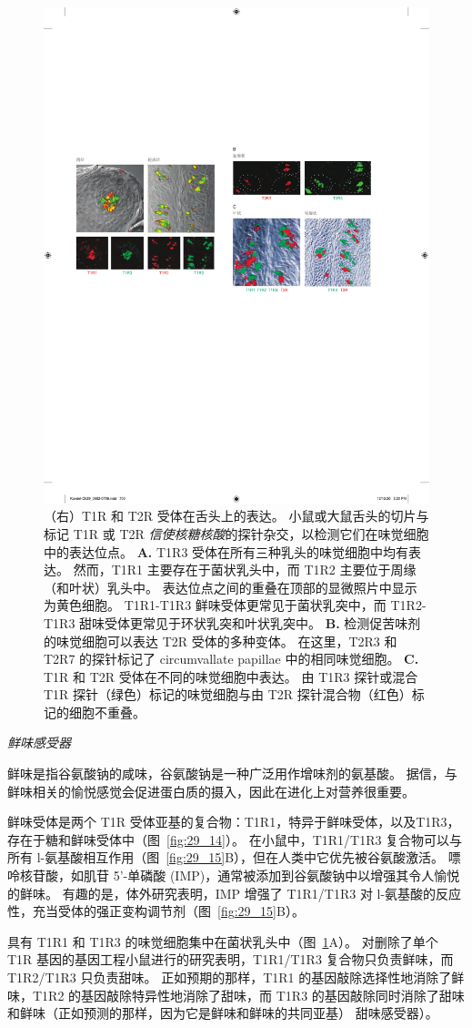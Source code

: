 \begin{figure}[htbp]
	\centering
	\includegraphics[width=0.5\linewidth]{chap29/fig_29_16}
	\caption{（右）T1R 和 T2R 受体在舌头上的表达。 小鼠或大鼠舌头的切片与标记 T1R 或 T2R \textit{信使核糖核酸}的探针杂交，以检测它们在味觉细胞中的表达位点。
		\textbf{A.} T1R3 受体在所有三种乳头的味觉细胞中均有表达。
		然而，T1R1 主要存在于菌状乳头中，而 T1R2 主要位于周缘（和叶状）乳头中。
		表达位点之间的重叠在顶部的显微照片中显示为黄色细胞。
		T1R1-T1R3 鲜味受体更常见于菌状乳突中，而 T1R2-T1R3 甜味受体更常见于环状乳突和叶状乳突中。
		\textbf{B.} 检测促苦味剂的味觉细胞可以表达 T2R 受体的多种变体。
		在这里，T2R3 和 T2R7 的探针标记了 circumvallate papillae 中的相同味觉细胞。
		\textbf{C.} T1R 和 T2R 受体在不同的味觉细胞中表达。
		由 T1R3 探针或混合 T1R 探针（绿色）标记的味觉细胞与由 T2R 探针混合物（红色）标记的细胞不重叠。}
	\label{fig:29_16}
\end{figure}


\textit{鲜味感受器}

鲜味是指谷氨酸钠的咸味，谷氨酸钠是一种广泛用作增味剂的氨基酸。
据信，与鲜味相关的愉悦感觉会促进蛋白质的摄入，因此在进化上对营养很重要。


鲜味受体是两个 T1R 受体亚基的复合物：T1R1，特异于鲜味受体，以及T1R3，存在于糖和鲜味受体中（图~\ref{fig:29_14}）。
在小鼠中，T1R1/T1R3 复合物可以与所有 l-氨基酸相互作用（图~\ref{fig:29_15}B），但在人类中它优先被谷氨酸激活。
嘌呤核苷酸，如肌苷 5'-单磷酸 (IMP)，通常被添加到谷氨酸钠中以增强其令人愉悦的鲜味。
有趣的是，体外研究表明，IMP 增强了 T1R1/T1R3 对 l-氨基酸的反应性，充当受体的强正变构调节剂（图~\ref{fig:29_15}B）。


具有 T1R1 和 T1R3 的味觉细胞集中在菌状乳头中（图~\ref{fig:29_16}A）。
对删除了单个 T1R 基因的基因工程小鼠进行的研究表明，T1R1/T1R3 复合物只负责鲜味，而 T1R2/T1R3 只负责甜味。
正如预期的那样，T1R1 的基因敲除选择性地消除了鲜味，T1R2 的基因敲除特异性地消除了甜味，而 T1R3 的基因敲除同时消除了甜味和鲜味（正如预测的那样，因为它是鲜味和鲜味的共同亚基） 甜味感受器）。



